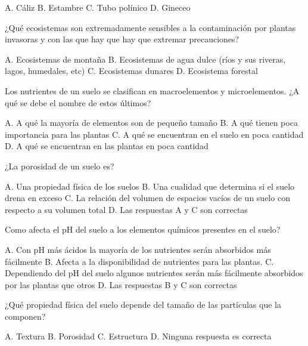 \documentclass[11pt]{exam}
\begin{document}
{\begin{questions}
  \begin{checkboxes}
    \choice A. Cáliz
    \CorrectChoice B. Estambre
    \choice C. Tubo polínico
    \choice D. Gineceo
  \end{checkboxes}
  \question ¿Qué ecosistemas son extremadamente sensibles a la contaminación por
  plantas invasoras y con las que hay que hay que extremar precauciones?
  \begin{checkboxes}
    \choice A. Ecosistemas de montaña
    \CorrectChoice B. Ecosistemas de agua dulce (ríos y sus
    riveras, lagos, humedales, etc)
    \choice C. Ecosistemas dunares
    \choice D. Ecosistema forestal
  \end{checkboxes}
  \question Los nutrientes de un suelo se clasifican en macroelementos y microelementos. ¿A
  qué se debe el nombre de estos últimos?
  \begin{checkboxes}
    \choice A. A qué la mayoría de elementos son de pequeño tamaño
    \choice B. A qué tienen poca importancia para las plantas
    \choice C. A qué se encuentran en el suelo en poca cantidad
    \CorrectChoice D. A qué se encuentran en las plantas en poca cantidad 
  \end{checkboxes}
  \question ¿La porosidad de un suelo es?
  \begin{checkboxes}
    \choice A. Una propiedad física de los suelos
    \choice B. Una cualidad que determina si el suelo drena en exceso
    \choice C. La relación del volumen de espacios vacíos de un suelo con
    respecto a su volumen total
    \CorrectChoice D. Las respuestas A y C son correctas
  \end{checkboxes}
  \question Como afecta el pH del suelo a los elementos químicos presentes en el suelo?
  \begin{checkboxes}
    \choice A. Con pH más ácidos la mayoría de los nutrientes serán absorbidos más
    fácilmente
    \choice B. Afecta a la disponibilidad de nutrientes para las plantas.
    \choice C. Dependiendo del pH del suelo algunos nutrientes serán más fácilmente
    absorbidos por las plantas que otros
    \CorrectChoice D. Las respuestas B y C son correctas
  \end{checkboxes}
  \newpage
  \question ¿Qué propiedad física del suelo depende del tamaño de las partículas que la
  componen?
  \begin{checkboxes}
    \CorrectChoice A. Textura
    \choice B. Porosidad
    \choice C. Estructura
    \choice D. Ninguna respuesta es correcta
  \end{checkboxes}

\end{questions}}
\end{document}

